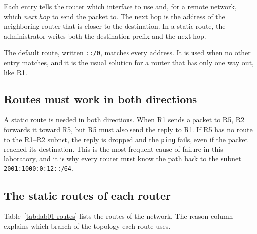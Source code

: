 Each entry tells the router which interface to use and, for a remote network, which \emph{next hop} to send the packet to. The next hop is the address of the neighboring router that is closer to the destination. In a static route, the administrator writes both the destination prefix and the next hop.

The default route, written \texttt{::/0}, matches every address. It is used when no other entry matches, and it is the usual solution for a router that has only one way out, like R1.

\subsection{Routes must work in both directions}

A static route is needed in both directions. When R1 sends a packet to R5, R2 forwards it toward R5, but R5 must also send the reply to R1. If R5 has no route to the R1--R2 subnet, the reply is dropped and the \texttt{ping} fails, even if the packet reached its destination. This is the most frequent cause of failure in this laboratory, and it is why every router must know the path back to the subnet \texttt{2001:1000:0:12::/64}.

\subsection{The static routes of each router}

Table~\ref{tab:lab01-routes} lists the routes of the network. The reason column explains which branch of the topology each route uses.

